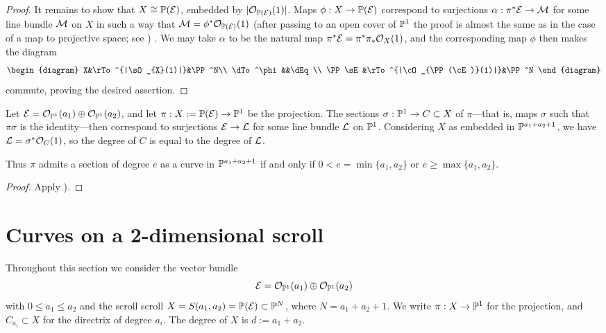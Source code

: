 \begin{proof}
It remains to show that $X \cong {\mathbb P}({\mathcal E})$, embedded by $|{\mathcal O}_{{\mathbb P}({\cal E})}(1)|$. Maps $\phi: X \to {\mathbb P} ({\mathcal E})$ correspond to surjections 
$\alpha: \pi^* {\mathcal E} \to {\mathcal M}$ for some line bundle ${\mathcal M}$ on $X$ in such a way that ${\mathcal M} = \phi^*{\mathcal O}_{{\mathbb P}({\mathcal E})}(1)$ (after passing to an open
cover of ${\mathbb P}^1$ the proof is almost the same as in the case of a map to projective space; see \cite[II.7.12]{Hartshorne1977}) . We may take $\alpha$ to be the 
natural map $\pi^*{\mathcal E} = \pi^*\pi_*{\mathcal O}_X(1)$, and the corresponding map $\phi$ then makes the diagram
$$
\begin{diagram}
 X&\rTo^{|\sO_{X}(1)|}&\PP^N\\
\dTo^\phi&&\dEq \\
\PP\sE &\rTo^{|\cO_{\PP(\cE)}(1)|}&\PP^N
\end{diagram}
$$
commute, proving the desired assertion.
\end{proof}
 
\begin{proposition}
Let ${\mathcal E} = {\mathcal O}_{{\mathbb P}^1}(a_1)\oplus {\mathcal O}_{{\mathbb P}^1}(a_2)$, and let $\pi: X:= {\mathbb P}({\mathcal E}) \to {\mathbb P}^1$ be the projection.
The sections $\sigma:{\mathbb P}^1 \to C\subset X$ of $\pi$---that is, maps $\sigma$ such that $\pi\sigma$ is the identity---then 
correspond to surjections
${\mathcal E} \to {\mathcal L}$ for some line bundle ${\mathcal L}$ on ${\mathbb P}^1$. Considering  $X$ as embedded in 
${\mathbb P}^{a_1+a_2+1}$, we have ${\mathcal L} = \sigma^*{\mathcal O}_C(1)$, so the degree of $C$ is equal
to the degree of ${\mathcal L}$.

Thus $\pi$ admits a section of degree $e$ as a curve in ${\mathbb P}^{a_1+a_2+1}$ if and only if
$0<e = \min\{a_1,a_2\}$ or $e\geq \max\{a_1, a_2\}$.
\end{proposition}

\begin{proof}
Apply \cite[II.7.12]{Hartshorne1977}).
\end{proof}

\section{Curves on a 2-dimensional scroll} 
 Throughout this section we consider the vector bundle 
$$
{\mathcal E} = {\mathcal O}_{{\mathbb P}^1}(a_1) \oplus{\mathcal O}_{{\mathbb P}^1}(a_2)
$$
with $0\leq a_1\leq a_2$ and the scroll
scroll $X = S(a_{1}, a_{2}) = {\mathbb P}({\mathcal E}) \subset {\mathbb P}^N$, where $N = a_1+a_2+1$. We write $\pi:X \to {\mathbb P}^1$ for the projection, and
$C_{a_i}\subset X$ for the directrix of degree $a_i$. The degree of $X$ is $d := a_1+a_2$.

